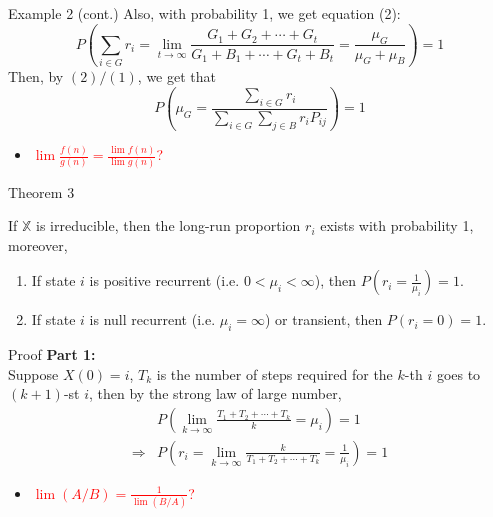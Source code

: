 \documentclass{beamer}
\begin{document}
\begin{frame}{Example 2 (cont.)}
	Also, with probability 1, we get equation (2):
	\[
	P\left( \sum_{i \in G} r_i = 
	\lim_{t\to\infty}\frac{G_1 + G_2 + \cdots + G_t}{G_1 + B_1 + \cdots + G_t + B_t}
	= \frac{\mu_G}{\mu_G + \mu_B} \right) = 1
	\]
	Then, by $(2)/(1)$, we get that
	\[
	P\left( \mu_G = \frac{\sum_{i \in G} r_i}{\sum_{i \in G}\sum_{j \in B} r_i P_{ij}} \right) = 1
	\]
	\begin{itemize}
	\item \textcolor{red}{$\lim \frac{f(n)}{g(n)} = \frac{\lim f(n)}{\lim g(n)}$?}
	\end{itemize}
\end{frame}

\begin{frame}{Theorem 3}
	\begin{theorem}
	If $\mathbb{X}$ is irreducible, then the long-run proportion $r_i$ exists with probability 1, moreover,
	\begin{enumerate}
	\item If state $i$ is positive recurrent (i.e. $0 < \mu_i < \infty$), then $P(r_i = \frac{1}{\mu_i}) = 1$.
	\item If state $i$ is null recurrent (i.e. $\mu_i = \infty$) or transient, then $P(r_i = 0) = 1$.
	\end{enumerate}
	\end{theorem}
\end{frame}

\begin{frame}{Proof}
	\textbf{Part 1:} \\
	Suppose $X(0) = i$, $T_k$ is the number of steps required for the $k$-th $i$ goes to $(k+1)$-st $i$,
	then by the strong law of large number,
	\begin{align*}
	&P\left( \lim_{k\to\infty} \frac{T_1 + T_2 + \cdots + T_k}{k} = \mu_i \right) = 1 \\
	\Rightarrow & P\left( r_i = \lim_{k\to\infty} \frac{k}{T_1 + T_2 + \cdots + T_k} = \frac{1}{\mu_i} \right) = 1
	\end{align*}
	\begin{itemize}
	\item \textcolor{red}{$\lim (A/B) = \frac{1}{\lim (B/A)}$?}
	\end{itemize}
\end{frame}
\end{document}
